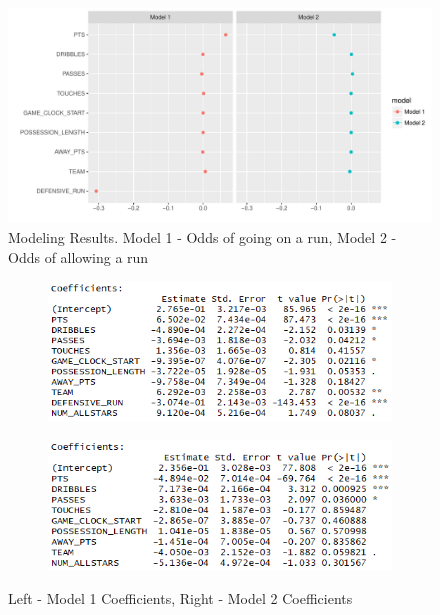 \documentclass{article}
\begin{document}
\begin{figure}[h]
\begin{center}
\includegraphics[width=175mm]{results.pdf}
\caption{Modeling Results. Model 1 - Odds of going on a run, Model 2 - Odds of allowing a run}
\end{center}
\end{figure}


\begin{figure}[h]
\centering
\begin{subfigure}{.5\textwidth}
  \centering
  \includegraphics[width=\linewidth]{odds_run_for.png}
  \label{fig:sub1}
\end{subfigure}%
\begin{subfigure}{.5\textwidth}
  \centering
  \includegraphics[width=\linewidth]{odds_run_against.png}
  \label{fig:sub2}
\end{subfigure}
\caption{Left - Model 1 Coefficients, Right - Model 2 Coefficients}
\label{fig:test}
\end{figure}
\end{document}
